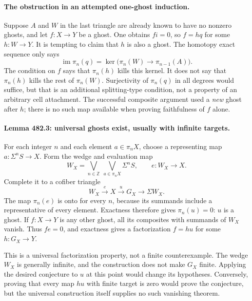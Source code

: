 \documentclass[11pt]{article}
\begin{document}
\paragraph{The obstruction in an attempted one-ghost induction.}
Suppose $A$ and $W$ in the last triangle are already known to have no
nonzero ghosts, and let $f:X\to Y$ be a ghost. One obtains $fi=0$, so
$f=hq$ for some $h:W\to Y$. It is tempting to claim that $h$ is also
a ghost. The homotopy exact sequence only says
\[
 \operatorname{im}\pi_n(q)
 =\ker\bigl(\pi_n(W)\longrightarrow\pi_{n-1}(A)\bigr).
\]
The condition on $f$ says that $\pi_n(h)$ kills this kernel. It does
not say that $\pi_n(h)$ kills the rest of $\pi_n(W)$. Surjectivity of
$\pi_n(q)$ in all degrees would suffice, but that is an additional
splitting-type condition, not a property of an arbitrary cell attachment.
The successful composite argument used a \emph{new} ghost after $h$;
there is no such map available when proving faithfulness of $f$ alone.

\paragraph{Lemma 482.3: universal ghosts exist, usually with infinite targets.}
For each integer $n$ and each element $a\in\pi_nX$, choose a representing
map $a:\Sigma^nS\to X$. Form the wedge and evaluation map
\[
 W_X=\bigvee_{n\in\mathbb Z}\ \bigvee_{a\in\pi_nX}\Sigma^nS,
 \qquad e:W_X\longrightarrow X.
\]
Complete it to a cofiber triangle
\begin{equation}\label{a482:universal}
        W_X\xrightarrow{e}X\xrightarrow{u}G_X\longrightarrow\Sigma W_X.
\end{equation}
The map $\pi_n(e)$ is onto for every $n$, because its summands include
a representative of every element. Exactness therefore gives $\pi_n(u)=0$:
$u$ is a ghost. If $f:X\to Y$ is any other ghost, all its composites
with summands of $W_X$ vanish. Thus $fe=0$, and exactness gives a
factorization $f=hu$ for some $h:G_X\to Y$.

This is a universal factorization property, not a finite counterexample.
The wedge $W_X$ is generally infinite, and the construction does not
make $G_X$ finite. Applying the desired conjecture to $u$ at this point
would change its hypotheses. Conversely, proving that every map $hu$
with finite target is zero would prove the conjecture, but the universal
construction itself supplies no such vanishing theorem.
\end{document}
